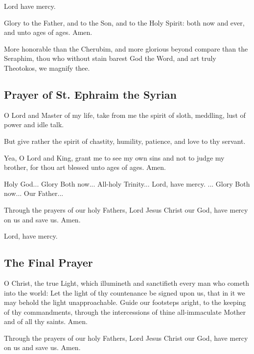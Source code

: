 Lord have mercy. 

Glory to the Father, and to the Son, and to the Holy Spirit: both now and ever, and unto ages of ages. Amen.

More honorable than the Cherubim, and more glorious beyond compare than the Seraphim, thou who without stain barest God the Word, and art truly Theotokos, we magnify thee.

\subsection{Prayer of St. Ephraim the Syrian}


O Lord and Master of my life, take from me the spirit of sloth, meddling, lust of power and idle talk. 

But give rather the spirit of chastity, humility, patience, and love to thy servant. 

Yea, O Lord and King, grant me to see my own sins and not to judge my brother, for thou art blessed unto ages of ages. Amen. 

Holy God... Glory  Both now... All-holy Trinity... Lord, have mercy. ... Glory  Both now... Our Father...

Through the prayers of our holy Fathers, Lord Jesus Christ our God, have mercy on us and save us. Amen.

Lord, have mercy. 

\subsection{The Final Prayer}

O Christ, the true Light, which illumineth and sanctifieth every man who cometh into the world: Let the light of thy countenance be signed upon us, that in it we may behold the light unapproachable. Guide our footsteps aright, to the keeping of thy commandments, through the intercessions of thine all-immaculate Mother and of all thy saints. Amen.

Through the prayers of our holy Fathers, Lord Jesus Christ our God, have mercy on us and save us. Amen.

\cleardoublepage
